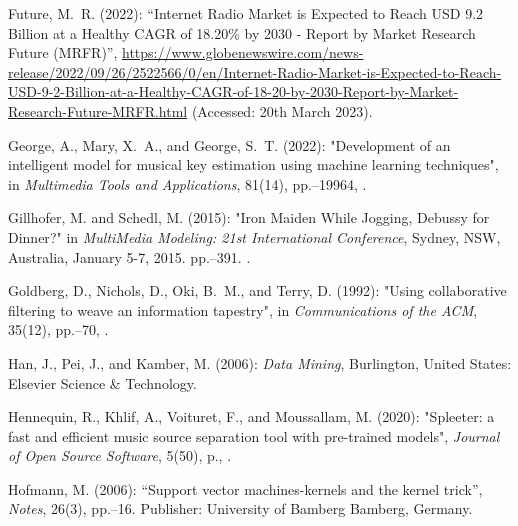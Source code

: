 \documentclass[11pt,titlepage,oneside]{book}
\begin{document}
\begin{thebibliography}{97}
	Future, M.~R. (2022): \enquote{Internet {Radio} {Market} is {Expected} to
		{Reach} {USD} 9.2 {Billion} at a {Healthy} {CAGR} of 18.20\% by 2030 -
		{Report} by {Market} {Research} {Future} ({MRFR})},
	\urlprefix\url{https://www.globenewswire.com/news-release/2022/09/26/2522566/0/en/Internet-Radio-Market-is-Expected-to-Reach-USD-9-2-Billion-at-a-Healthy-CAGR-of-18-20-by-2030-Report-by-Market-Research-Future-MRFR.html} (Accessed: 20th March 2023).
	
	George, A., Mary, X.~A., and George, S.~T. (2022): "Development of an
		intelligent model for musical key estimation using machine learning
		techniques", in \textit{Multimedia Tools and Applications}, 81(14),
	pp.--19964, .
	
	Gillhofer, M. and Schedl, M. (2015): "Iron {Maiden} {While} {Jogging},
		{Debussy} for {Dinner}?" in \textit{MultiMedia Modeling: 21st International Conference}, Sydney, NSW, Australia, January 5-7, 2015. pp.--391. .
	
	Goldberg, D., Nichols, D., Oki, B.~M., and Terry, D. (1992): "Using
		collaborative filtering to weave an information tapestry", in
	\textit{Communications of the ACM}, 35(12), pp.--70,
	.
	
	Han, J., Pei, J., and Kamber, M. (2006): \textit{Data {Mining}}, Burlington, United States: Elsevier Science \& Technology.
	
	Hennequin, R., Khlif, A., Voituret, F., and Moussallam, M. (2020):
	"Spleeter: a fast and efficient music source separation tool with
		pre-trained models", \textit{Journal of Open Source Software}, 5(50),
	p., .
	
	Hofmann, M. (2006): \enquote{Support vector machines-kernels and the kernel
		trick}, \textit{Notes}, 26(3), pp.--16. Publisher: University
	of Bamberg Bamberg, Germany.
	

\end{thebibliography}
\end{document}
